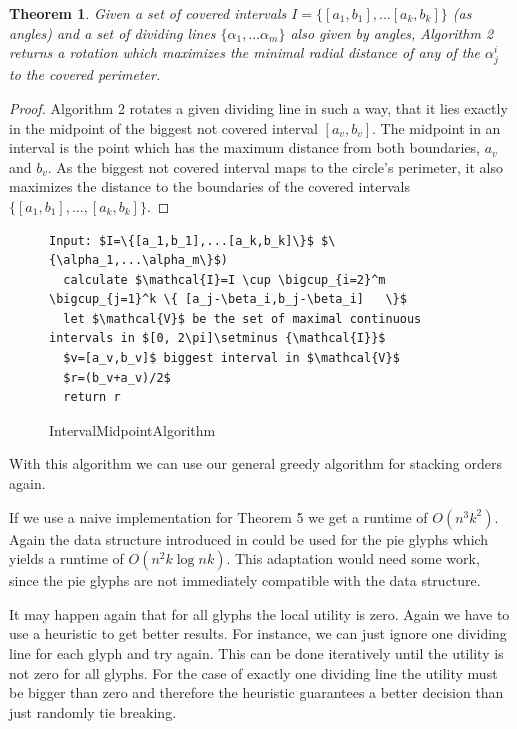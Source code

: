 \documentclass[a4paper,11pt]{article}
\newtheorem{theorem}{Theorem}
\begin{document}
\begin{theorem}
  Given a set of covered intervals $I=\{[a_1,b_1],...[a_k,b_k]\}$ (as angles) and a set of dividing lines $\{\alpha_1,...\alpha_m\}$ also given by angles, Algorithm 2 returns a rotation which maximizes the minimal radial distance of any of the $\alpha^i_j$ to the covered perimeter.
\end{theorem}

\begin{proof}
  Algorithm 2 rotates a given dividing line in such a way, that it lies exactly in the midpoint of the biggest not covered interval $[a_v, b_v]$. The midpoint in an interval is the point which has the maximum distance from both boundaries, $a_v$ and $b_v$. As the biggest not covered interval maps to the circle's perimeter, it also maximizes the distance to the boundaries of the covered intervals $\{[a_1, b_1], ..., [a_k, b_k]\}$.
\end{proof}

\begin{figure}[!bth]
  \begin{lstlisting}[mathescape=true ]
Input: $I=\{[a_1,b_1],...[a_k,b_k]\}$ $\{\alpha_1,...\alpha_m\}$)
  calculate $\mathcal{I}=I \cup \bigcup_{i=2}^m    \bigcup_{j=1}^k \{ [a_j-\beta_i,b_j-\beta_i]   \}$
  let $\mathcal{V}$ be the set of maximal continuous intervals in $[0, 2\pi]\setminus {\mathcal{I}}$
  $v=[a_v,b_v]$ biggest interval in $\mathcal{V}$
  $r=(b_v+a_v)/2$
  return r
  \end{lstlisting}
  \caption{IntervalMidpointAlgorithm}
\end{figure}

With this algorithm we can use our general greedy algorithm for stacking orders again.

If we use a naive implementation for Theorem 5 we get a runtime of $O(n^3k^2)$. Again the data structure introduced in \cite{cabello} could be used for the pie glyphs which yields a runtime of $O(n^2k \log nk)$. This adaptation would need some work, since the pie glyphs are not immediately  compatible with the data structure.


It may happen again that for all glyphs the local utility is zero. Again we have to use a heuristic to get better results. For instance, we can just ignore one dividing line for each glyph and try again. This can be done iteratively until the utility is not zero for all glyphs. For the case of exactly one dividing line the utility must be bigger than zero and therefore the heuristic guarantees a better decision than just randomly tie breaking.
\end{document}
